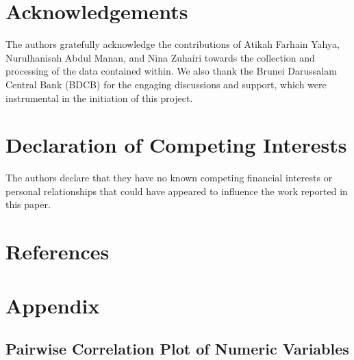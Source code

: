 \documentclass[
  number]{elsarticle}
\begin{document}
\section{Acknowledgements}\label{acknowledgements}

The authors gratefully acknowledge the contributions of Atikah Farhain
Yahya, Nurulhanisah Abdul Manan, and Nina Zuhairi towards the collection
and processing of the data contained within. We also thank the Brunei
Darussalam Central Bank (BDCB) for the engaging discussions and support,
which were instrumental in the initiation of this project.

\section{Declaration of Competing
Interests}\label{declaration-of-competing-interests}

The authors declare that they have no known competing financial
interests or personal relationships that could have appeared to
influence the work reported in this paper.

\section*{References}\label{references}

\renewcommand{\bibsection}{}


\section{Appendix}\label{appendix}

\subsection{Pairwise Correlation Plot of Numeric
Variables}\label{pairwise-correlation-plot-of-numeric-variables}
\end{document}
